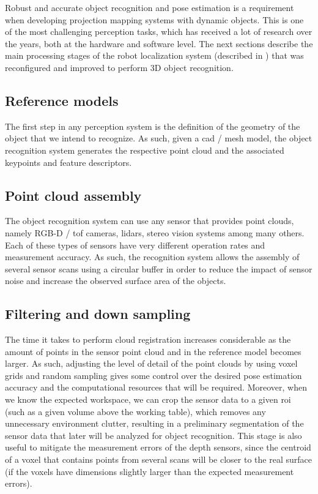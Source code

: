 Robust and accurate object recognition and pose estimation is a requirement when developing projection mapping systems with dynamic objects. This is one of the most challenging perception tasks, which has received a lot of research over the years, both at the hardware and software level. The next sections describe the main processing stages of the robot localization system (described in \cite{Costa2016}) that was reconfigured and improved to perform 3D object recognition.


\subsection{Reference models}

The first step in any perception system is the definition of the geometry of the object that we intend to recognize. As such, given a \gls{cad} / mesh model, the object recognition system generates the respective point cloud and the associated keypoints and feature descriptors.


\subsection{Point cloud assembly}

The object recognition system can use any sensor that provides point clouds, namely RGB-D / \gls{tof} cameras, \glspl{lidar}, stereo vision systems among many others. Each of these types of sensors have very different operation rates and measurement accuracy. As such, the recognition system allows the assembly of several sensor scans using a circular buffer in order to reduce the impact of sensor noise and increase the observed surface area of the objects.


\subsection{Filtering and down sampling}

The time it takes to perform cloud registration increases considerable as the amount of points in the sensor point cloud and in the reference model becomes larger. As such, adjusting the level of detail of the point clouds by using voxel grids and random sampling gives some control over the desired pose estimation accuracy and the computational resources that will be required. Moreover, when we know the expected workspace, we can crop the sensor data to a given \gls{roi} (such as a given volume above the working table), which removes any unnecessary environment clutter, resulting in a preliminary segmentation of the sensor data that later will be analyzed for object recognition. This stage is also useful to mitigate the measurement errors of the depth sensors, since the centroid of a voxel that contains points from several scans will be closer to the real surface (if the voxels have dimensions slightly larger than the expected measurement errors).


